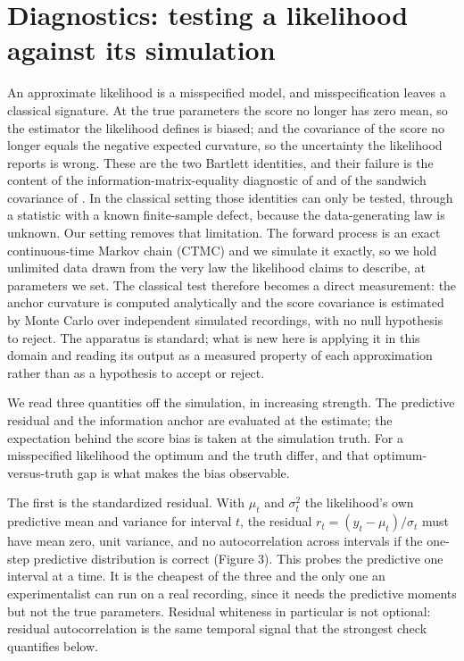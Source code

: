\section*{Diagnostics: testing a likelihood against its simulation}

An approximate likelihood is a misspecified model, and misspecification leaves a classical signature. At the true parameters the score no longer has zero mean, so the estimator the likelihood defines is biased; and the covariance of the score no longer equals the negative expected curvature, so the uncertainty the likelihood reports is wrong. These are the two Bartlett identities, and their failure is the content of the information-matrix-equality diagnostic of \cite{white1982maximum} and of the sandwich covariance of \cite{huber1967behavior,godambe1960optimum}. In the classical setting those identities can only be tested, through a statistic with a known finite-sample defect, because the data-generating law is unknown. Our setting removes that limitation. The forward process is an exact continuous-time Markov chain (CTMC) and we simulate it exactly, so we hold unlimited data drawn from the very law the likelihood claims to describe, at parameters we set. The classical test therefore becomes a direct measurement: the anchor curvature is computed analytically and the score covariance is estimated by Monte Carlo over independent simulated recordings, with no null hypothesis to reject. The apparatus is standard; what is new here is applying it in this domain and reading its output as a measured property of each approximation rather than as a hypothesis to accept or reject.

We read three quantities off the simulation, in increasing strength. The predictive residual and the information anchor are evaluated at the estimate; the expectation behind the score bias is taken at the simulation truth. For a misspecified likelihood the optimum and the truth differ, and that optimum-versus-truth gap is what makes the bias observable.

The first is the standardized residual. With $\mu_t$ and $\sigma_t^2$ the likelihood's own predictive mean and variance for interval $t$, the residual $r_t=(y_t-\mu_t)/\sigma_t$ must have mean zero, unit variance, and no autocorrelation across intervals if the one-step predictive distribution is correct (Figure 3). This probes the predictive one interval at a time. It is the cheapest of the three and the only one an experimentalist can run on a real recording, since it needs the predictive moments but not the true parameters. Residual whiteness in particular is not optional: residual autocorrelation is the same temporal signal that the strongest check quantifies below.

